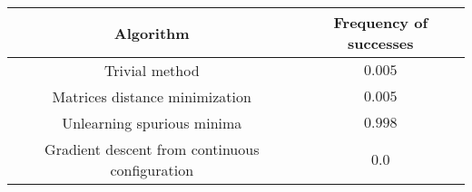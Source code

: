 \begin{tabular}{cc}
\toprule
Algorithm                                      & Frequency of successes \\ \midrule
Trivial method                           & $0.005$                \\
Matrices distance minimization                 & $0.005$                    \\ 
Unlearning spurious minima                     & $0.998$                    \\
Gradient descent from continuous configuration & $0.0$                    \\
\bottomrule
\end{tabular}
